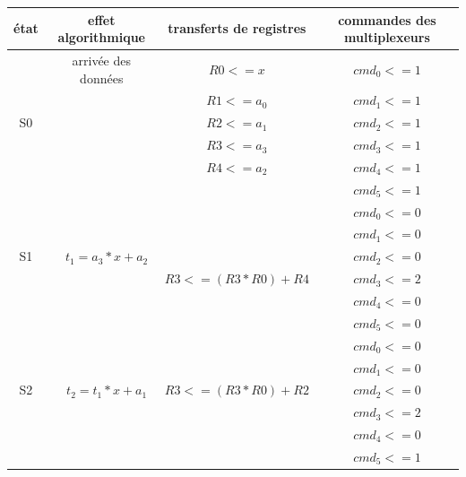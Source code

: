 \documentclass[a4paper,11pt]{exam}
\begin{document}
\begin{questions}
\begin{solution}
    \begin{tabular}{|c | c | c | c|}
      \hline
      état & effet algorithmique & transferts de registres & commandes des multiplexeurs \\
      \hline
      ~   & arrivée des données & $R0 <= x$                 & $cmd_0 <= 1$                  \\
      ~   & ~                   & $R1 <= a_0$               & $cmd_1 <= 1$                  \\
      S0  & ~                   & $R2 <= a_1$               & $cmd_2 <= 1$                  \\
      ~   & ~                   & $R3 <= a_3$               & $cmd_3 <= 1$                  \\
      ~   & ~                   & $R4 <= a_2$               & $cmd_4 <= 1$                  \\
      ~   & ~                   & ~                         & $cmd_5 <= 1$                  \\
      \hline
      ~   & ~                   & ~                         & $cmd_0 <= 0$                  \\
      ~   & ~                   & ~                         & $cmd_1 <= 0$                  \\
      S1  & ~ $t_1=a_3*x+a_2$   & ~                         & $cmd_2 <= 0$                  \\
      ~   & ~                   & $R3 <= (R3*R0)+R4$        & $cmd_3 <= 2$                  \\
      ~   & ~                   & ~                         & $cmd_4 <= 0$                  \\
      ~   & ~                   & ~                         & $cmd_5 <= 0$                  \\
      \hline
      ~   & ~                   & ~                         & $cmd_0 <= 0$                  \\
      ~   & ~                   & ~                         & $cmd_1 <= 0$                  \\
      S2  & ~ $t_2=t_1*x+a_1$   & $R3 <= (R3*R0)+R2$        & $cmd_2 <= 0$                  \\
      ~   & ~                   & ~                         & $cmd_3 <= 2$                  \\
      ~   & ~                   & ~                         & $cmd_4 <= 0$                  \\
      ~   & ~                   & ~                         & $cmd_5 <= 1$                  \\

\end{tabular}
\end{solution}
\end{questions}
\end{document}
